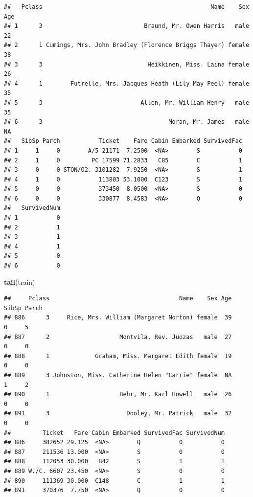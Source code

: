 \documentclass[]{article}
\newenvironment{Shaded}{\begin{snugshade}}{\end{snugshade}}
\newcommand{\KeywordTok}[1]{\textcolor[rgb]{0.13,0.29,0.53}{\textbf{#1}}}
\newcommand{\NormalTok}[1]{#1}
\begin{document}
\begin{verbatim}
##   Pclass                                                Name    Sex Age
## 1      3                             Braund, Mr. Owen Harris   male  22
## 2      1 Cumings, Mrs. John Bradley (Florence Briggs Thayer) female  38
## 3      3                              Heikkinen, Miss. Laina female  26
## 4      1        Futrelle, Mrs. Jacques Heath (Lily May Peel) female  35
## 5      3                            Allen, Mr. William Henry   male  35
## 6      3                                    Moran, Mr. James   male  NA
##   SibSp Parch           Ticket    Fare Cabin Embarked SurvivedFac
## 1     1     0        A/5 21171  7.2500  <NA>        S           0
## 2     1     0         PC 17599 71.2833   C85        C           1
## 3     0     0 STON/O2. 3101282  7.9250  <NA>        S           1
## 4     1     0           113803 53.1000  C123        S           1
## 5     0     0           373450  8.0500  <NA>        S           0
## 6     0     0           330877  8.4583  <NA>        Q           0
##   SurvivedNum
## 1           0
## 2           1
## 3           1
## 4           1
## 5           0
## 6           0
\end{verbatim}

\begin{Shaded}
\begin{Highlighting}[]
\KeywordTok{tail}\NormalTok{(train)}
\end{Highlighting}
\end{Shaded}

\begin{verbatim}
##     Pclass                                     Name    Sex Age SibSp Parch
## 886      3     Rice, Mrs. William (Margaret Norton) female  39     0     5
## 887      2                    Montvila, Rev. Juozas   male  27     0     0
## 888      1             Graham, Miss. Margaret Edith female  19     0     0
## 889      3 Johnston, Miss. Catherine Helen "Carrie" female  NA     1     2
## 890      1                    Behr, Mr. Karl Howell   male  26     0     0
## 891      3                      Dooley, Mr. Patrick   male  32     0     0
##         Ticket   Fare Cabin Embarked SurvivedFac SurvivedNum
## 886     382652 29.125  <NA>        Q           0           0
## 887     211536 13.000  <NA>        S           0           0
## 888     112053 30.000   B42        S           1           1
## 889 W./C. 6607 23.450  <NA>        S           0           0
## 890     111369 30.000  C148        C           1           1
## 891     370376  7.750  <NA>        Q           0           0
\end{verbatim}
\end{document}

